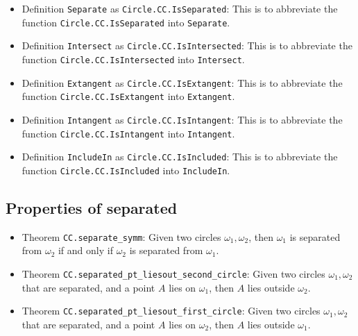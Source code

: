 \documentclass[12pt]{amsart}
\begin{document}
\begin{itemize}
    \item Definition \verb|Separate| as \verb|Circle.CC.IsSeparated|: This is to abbreviate the function \verb|Circle.CC.IsSeparated| into \verb|Separate|.
    \item Definition \verb|Intersect| as \verb|Circle.CC.IsIntersected|: This is to abbreviate the function \verb|Circle.CC.IsIntersected| into \verb|Intersect|.
    \item Definition \verb|Extangent| as \verb|Circle.CC.IsExtangent|: This is to abbreviate the function \verb|Circle.CC.IsExtangent| into \verb|Extangent|.
    \item Definition \verb|Intangent| as \verb|Circle.CC.IsIntangent|: This is to abbreviate the function \verb|Circle.CC.IsIntangent| into \verb|Intangent|.
    \item Definition \verb|IncludeIn| as \verb|Circle.CC.IsIncluded|: This is to abbreviate the function \verb|Circle.CC.IsIncluded| into \verb|IncludeIn|.
\end{itemize}

\subsection{Properties of separated}
\begin{itemize}
    \item Theorem \verb|CC.separate_symm|: Given two circles $\omega_1,\omega_2$, then $\omega_1$ is separated from $\omega_2$ if and only if $\omega_2$ is separated from $\omega_1$.
    \item Theorem \verb|CC.separated_pt_liesout_second_circle|: Given two circles $\omega_1, \omega_2$ that are separated, and a point $A$ lies on $\omega_1$, then $A$ lies outside $\omega_2$.
    \item Theorem \verb|CC.separated_pt_liesout_first_circle|: Given two circles $\omega_1, \omega_2$ that are separated, and a point $A$ lies on $\omega_2$, then $A$ lies outside $\omega_1$.
\end{itemize}
\end{document}
